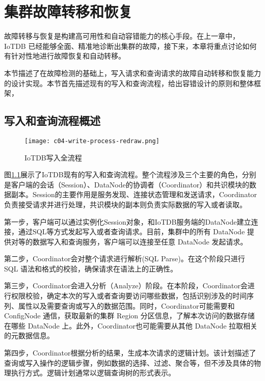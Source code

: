 
\chapter{集群故障转移和恢复}

故障转移与恢复是构建高可用性和自动容错能力的核心手段。在上一章中，IoTDB 已经能够全面、精准地诊断出集群的故障，接下来，本章将重点讨论如何有针对性地进行故障恢复和自动转移。

本节描述了在故障检测的基础上，写入请求和查询请求的故障自动转移和恢复能力的设计实现。本节首先描述现有的写入和查询流程，给出容错设计的原则和整体框架，

\section{写入和查询流程概述}

\begin{figure}
  \centering
  \texttt{[image: c04-write-process-redraw.png]}
  \caption{IoTDB写入全流程}
  \label{fig:c04-write-process}
\end{figure}

图\ref{fig:c04-write-process}展示了IoTDB现有的写入和查询流程。整个流程涉及三个主要的角色，分别是客户端的会话（Session）、DataNode的协调者（Coordinator）和共识模块的数据副本。Session的主要作用是服务发现、连接状态管理和发送请求，Coordinator负责接受请求并进行处理，共识模块的副本则负责实际数据的写入或者读取。

第一步，客户端可以通过实例化Session对象，和IoTDB服务端的DataNode建立连接，通过SQL等方式发起写入或者查询请求。目前，集群中的所有 DataNode 提供对等的数据写入和查询服务，客户端可以连接至任意 DataNode 发起请求。

第二步，Coordinator会对整个请求进行解析(SQL Parse)。在这个阶段只进行 SQL 语法和格式的校验，确保请求在语法上的正确性。

第三步，Coordinator会进入分析（Analyze）阶段。在本阶段，Coordinator会进行权限校验，确定本次的写入或者查询要访问哪些数据，包括识别涉及的时间序列、属性以及需要查询或写入的数据范围。同时，Coordinator可能需要和ConfigNode 通信，获取最新的集群 Region 分区信息，了解本次访问的数据存储在哪些 DataNode 上。此外，Coordinator也可能需要从其他 DataNode 拉取相关的元数据信息。

第四步，Coordinator根据分析的结果，生成本次请求的逻辑计划。该计划描述了查询或写入操作的逻辑步骤，例如数据的选择、过滤、聚合等，但不涉及具体的物理执行方式。逻辑计划通常以逻辑查询树的形式表示。

